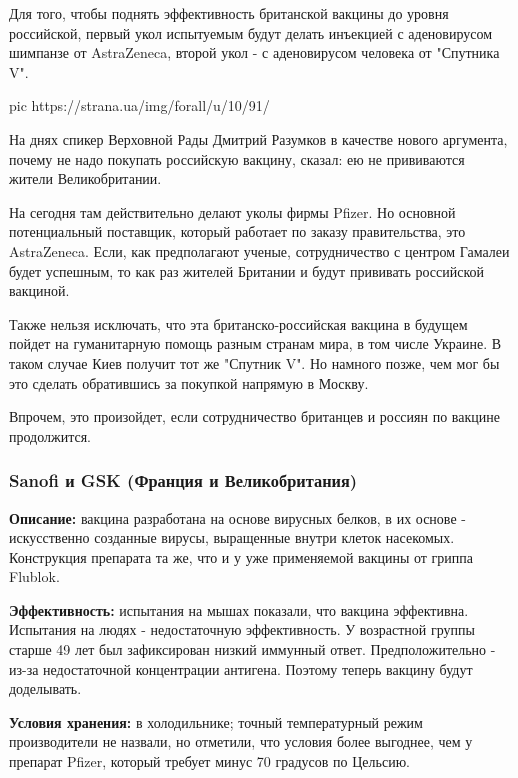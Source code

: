 Для того, чтобы поднять эффективность британской вакцины до уровня российской,
первый укол испытуемым будут делать инъекцией с аденовирусом шимпанзе от
AstraZeneca, второй укол - с аденовирусом человека от "Спутника V". 

\ifcmt
pic https://strana.ua/img/forall/u/10/91/%
\fi

На днях спикер Верховной Рады Дмитрий Разумков в качестве нового аргумента,
почему не надо покупать российскую вакцину, сказал: ею не прививаются жители
Великобритании.

На сегодня там действительно делают уколы фирмы Pfizer. Но основной
потенциальный поставщик, который работает по заказу правительства, это
AstraZeneca. Если, как предполагают ученые, сотрудничество с центром Гамалеи
будет успешным, то как раз жителей Британии и будут прививать российской
вакциной.

Также нельзя исключать, что эта британско-российская вакцина в будущем пойдет
на гуманитарную помощь разным странам мира, в том числе Украине. В таком случае
Киев получит тот же "Спутник V". Но намного позже, чем мог бы это сделать
обратившись за покупкой напрямую в Москву. 

Впрочем, это произойдет, если сотрудничество британцев и россиян по вакцине
продолжится. 

\subsubsection{Sanofi и GSK (Франция и Великобритания)}

\textbf{Описание:} вакцина разработана на основе вирусных белков, в их основе -
искусственно созданные вирусы, выращенные внутри клеток насекомых. Конструкция
препарата та же, что и у уже применяемой вакцины от гриппа Flublok.

\textbf{Эффективность:} испытания на мышах показали, что вакцина эффективна. Испытания
на людях - недостаточную эффективность. У возрастной группы старше 49 лет был
зафиксирован низкий иммунный ответ. Предположительно - из-за недостаточной
концентрации антигена. Поэтому теперь вакцину будут доделывать. 

\textbf{Условия хранения:} в холодильнике; точный температурный режим производители не
назвали, но отметили, что условия более выгоднее, чем у препарат Pfizer,
который требует минус 70 градусов по Цельсию. 


